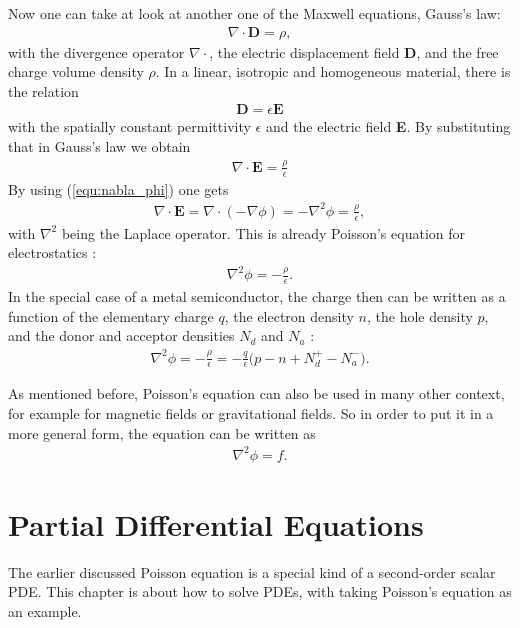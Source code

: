 Now one can take at look at another one of the Maxwell equations, Gauss's law:
\begin{gather}
\nabla \cdot \textbf{D} = \rho,
\end{gather}
with the divergence operator $\nabla \cdot$, the electric displacement field \textbf{D}, and the free charge volume density $\rho$.
In a linear, isotropic and homogeneous material, there is the relation
\begin{gather}
\textbf{D} = \epsilon \textbf{E}
\end{gather}
with the spatially constant permittivity $\epsilon$ and the electric field \textbf{E}. By substituting that in Gauss's law we obtain
\begin{gather}
\nabla \cdot \textbf{E} = \frac{\rho}{\epsilon}	
\end{gather}
By using (\ref{equ:nabla_phi}) one gets
\begin{gather}
\nabla \cdot \textbf{E} = \nabla \cdot (-\nabla \phi) = -\nabla ^2 \phi = \frac{\rho}{\epsilon},
\end{gather}
with $\nabla ^2$ being the Laplace operator. This is already Poisson's equation for electrostatics \cite{prechtl}:
\begin{gather}
\nabla ^2 \phi = -\frac{\rho}{\epsilon}.
\end{gather}
In the special case of a metal semiconductor, the charge then can be written as a function of the elementary charge $q$, the electron density $n$, the hole density $p$, and the donor and acceptor densities $N_d$ and $N_a$ \cite{van2004principles}:
\begin{gather}
\nabla ^2 \phi = -\frac{\rho}{\epsilon} = -\frac{q}{\epsilon} \big(p-n + N_d^+ - N_a^-\big).
\end{gather}

As mentioned before, Poisson's equation can also be used in many other context, for example for magnetic fields or gravitational fields. So in order to put it in a more general form, the equation can be written as
\begin{gather}
\nabla ^2 \phi = f.
\end{gather}


\section{Partial Differential Equations}
The earlier discussed Poisson equation is a special kind of a second-order scalar PDE. This chapter is about how to solve PDEs, with taking Poisson's equation as an example.


